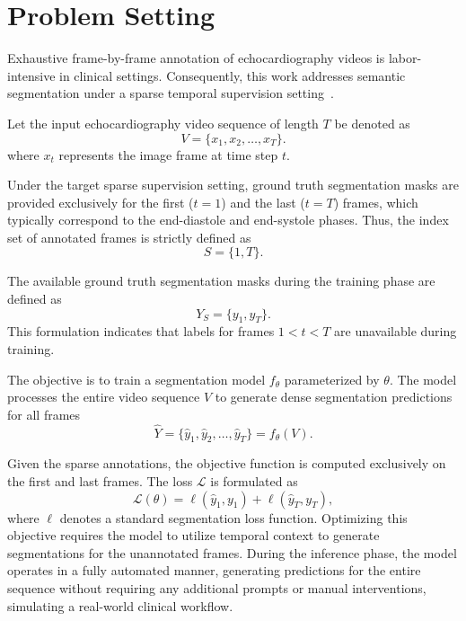 \section{Problem Setting}

\noindent 
Exhaustive frame-by-frame annotation of echocardiography videos is labor-intensive in clinical settings.
Consequently, this work addresses semantic segmentation under a sparse temporal supervision setting~\cite{ICCV25_gdkvm}.

Let the input echocardiography video sequence of length $T$ be denoted as
\begin{equation*}
    V = \{x_1, x_2, \dots, x_T\}.
\end{equation*}
where $x_t$ represents the image frame at time step $t$. 

Under the target sparse supervision setting, ground truth segmentation masks are provided exclusively for the first ($t=1$) and the last ($t=T$) frames, which typically correspond to the end-diastole and end-systole phases.
Thus, the index set of annotated frames is strictly defined as
\begin{equation*}
    S = \{1, T\}.
\end{equation*}

The available ground truth segmentation masks during the training phase are defined as
\begin{equation*}
    Y_S = \{y_1, y_T\}.
\end{equation*}
\noindent
This formulation indicates that labels for frames $1 < t < T$ are unavailable during training.

The objective is to train a segmentation model $f_\theta$ parameterized by $\theta$.
The model processes the entire video sequence $V$ to generate dense segmentation predictions for all frames
\begin{equation*}
    \hat{Y} = \{\hat{y}_1, \hat{y}_2, \dots, \hat{y}_T\} = f_\theta(V).
\end{equation*}

Given the sparse annotations, the objective function is computed exclusively on the first and last frames.
The loss $\mathcal{L}$ is formulated as
\begin{equation*}
    \mathcal{L}(\theta) = \ell(\hat{y}_1, y_1) + \ell(\hat{y}_T, y_T),
\end{equation*}
where $\ell$ denotes a standard segmentation loss function.
Optimizing this objective requires the model to utilize temporal context to generate segmentations for the unannotated frames.
During the inference phase, the model operates in a fully automated manner, generating predictions for the entire sequence without requiring any additional prompts or manual interventions, simulating a real-world clinical workflow.